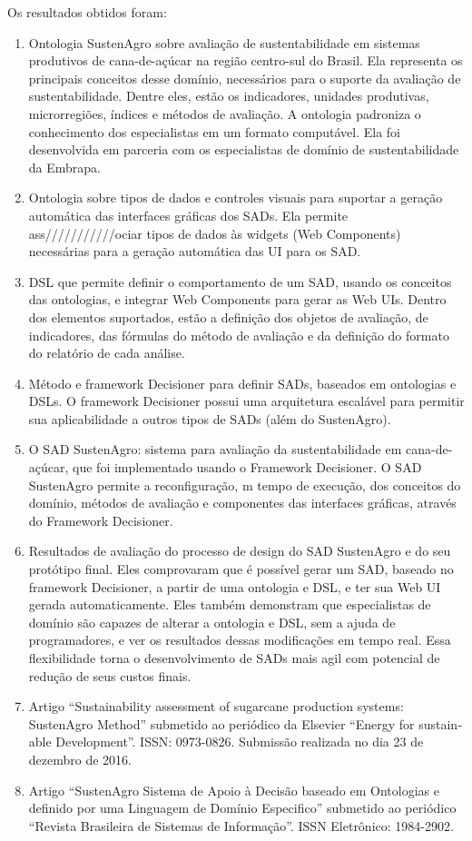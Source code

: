 Os resultados obtidos foram: 
\begin{enumerate}
\item Ontologia SustenAgro sobre avaliação de sustentabilidade em sistemas
produtivos de cana-de-açúcar na região centro-sul do Brasil. Ela representa
os principais conceitos desse domínio, necessários para o suporte
da avaliação de sustentabilidade. Dentre eles, estão os indicadores,
unidades produtivas, microrregiões, índices e métodos de avaliação.
A ontologia padroniza o conhecimento dos especialistas em um formato
computável. Ela foi desenvolvida em parceria com os especialistas
de domínio de sustentabilidade da Embrapa.
\item Ontologia sobre tipos de dados e controles visuais para suportar a
geração automática das interfaces gráficas dos SADs. Ela permite ass///////////ociar
tipos de dados às \foreignlanguage{english}{widgets} (Web Components)
necessárias para a geração automática das UI para os SAD.
\item DSL que permite definir o comportamento de um SAD, usando os conceitos
das ontologias, e integrar \foreignlanguage{english}{Web Components}
para gerar as Web UIs. Dentro dos elementos suportados, estão a definição
dos objetos de avaliação, de indicadores, das fórmulas do método de
avaliação e da definição do formato do relatório de cada análise.
\item Método e framework Decisioner para definir SADs, baseados em ontologias
e DSLs. O framework Decisioner possui uma arquitetura escalável para
permitir sua aplicabilidade a outros tipos de SADs (além do SustenAgro).
\item O SAD SustenAgro: sistema para avaliação da sustentabilidade em cana-de-açúcar,
que foi implementado usando o Framework Decisioner. O SAD SustenAgro
permite a reconfiguração, m tempo de execução, dos conceitos do domínio,
métodos de avaliação e componentes das interfaces gráficas, através
do \foreignlanguage{english}{Framework Decisioner}.
\item Resultados de avaliação do processo de design do SAD SustenAgro e
do seu protótipo final. Eles comprovaram que é possível gerar um SAD,
baseado no framework Decisioner, a partir de uma ontologia e DSL,
e ter sua Web UI gerada automaticamente. Eles também demonstram que
especialistas de domínio são capazes de alterar a ontologia e DSL,
sem a ajuda de programadores, e ver os resultados dessas modificações
em tempo real. Essa flexibilidade torna o desenvolvimento de SADs
mais agil com potencial de redução de seus custos finais.
\item Artigo “\foreignlanguage{english}{Sustainability assessment of sugarcane
production systems: SustenAgro Method}” submetido ao periódico da
\foreignlanguage{english}{Elsevier “Energy for sustainable Development”.}
ISSN: 0973-0826. Submissão realizada no dia 23 de dezembro de 2016.
\item Artigo ``SustenAgro Sistema de Apoio à Decisão baseado em Ontologias
e definido por uma Linguagem de Domínio Especifico'' submetido ao
periódico ``Revista Brasileira de Sistemas de Informação''. ISSN
Eletrônico: 1984-2902.
\end{enumerate}


